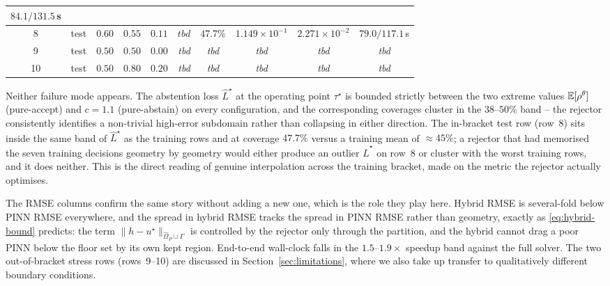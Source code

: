 \begin{table}[t]
\begin{tabular}{cccccccccc}
        $84.1/131.5$\,s \\
    \midrule
    8  & test & $0.60$ & $0.55$ & $0.11$ &
        $\mathbf{\textit{tbd}}$ & $\mathbf{47.7\%}$ &
        $1.149\!\times\!10^{-1}$ & $2.271\!\times\!10^{-2}$ &
        $\mathbf{79.0/117.1}$\,s \\
    9  & test & $0.50$ & $0.50$ & $0.00$ &
        \textit{tbd} & \textit{tbd} &
        \textit{tbd} & \textit{tbd} & \textit{tbd} \\
    10 & test & $0.50$ & $0.80$ & $0.20$ &
        \textit{tbd} & \textit{tbd} &
        \textit{tbd} & \textit{tbd} & \textit{tbd} \\
    \bottomrule
  \end{tabular}
\end{table}

Neither failure mode appears. The abstention loss
$\widehat{L}^\star$ at the operating point $\tau^\star$ is bounded
strictly between the two extreme values $\mathbb{E}[\rho^\theta]$
(pure-accept) and $c=1.1$ (pure-abstain) on every configuration, and
the corresponding coverages cluster in the $38\text{--}50\%$ band --
the rejector consistently identifies a non-trivial high-error
subdomain rather than collapsing in either direction. The
in-bracket test row (row~8) sits inside the same band of
$\widehat{L}^\star$ as the training rows and at coverage
$47.7\%$ versus a training mean of $\approx 45\%$; a rejector that
had memorised the seven training decisions geometry by geometry
would either produce an outlier $\widehat{L}^\star$ on row~8 or
cluster with the worst training rows, and it does neither. This is
the direct reading of genuine interpolation across the training
bracket, made on the metric the rejector actually optimises.

The RMSE columns confirm the same story without adding a new one,
which is the role they play here. Hybrid RMSE is several-fold below
PINN RMSE everywhere, and the spread in hybrid RMSE tracks the
spread in PINN RMSE rather than geometry, exactly as
\eqref{eq:hybrid-bound} predicts: the term
$\|h-u^\star\|_{\widehat{\Omega}_P\cup\Gamma}$ is controlled by the
rejector only through the partition, and the hybrid cannot drag a
poor PINN below the floor set by its own kept region. End-to-end
wall-clock falls in the $1.5\text{--}1.9\times$ speedup band against
the full solver. The two out-of-bracket stress rows (rows~9--10) are
discussed in Section~\ref{sec:limitations}, where we also take up
transfer to qualitatively different boundary conditions.
